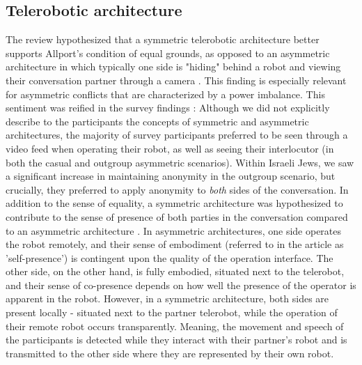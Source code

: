 \documentclass[dissertation,math,vertlayout,pdfa,colorlinks]{aaltoseries}
\begin{document}
\subsection{Telerobotic architecture}
The review hypothesized that a symmetric telerobotic architecture better supports Allport's condition of equal grounds, as opposed to an asymmetric architecture in which typically one side is "hiding" behind a robot and viewing their conversation partner through a camera \cite[p. 78]{peledTelerobotContactHypothesis2022}. This finding is especially relevant for asymmetric conflicts that are characterized by a power imbalance. This sentiment was reified in the survey findings \cite[p. 11]{peledTeleroboticIntergroupContact2024}: Although we did not explicitly describe to the participants the concepts of symmetric and asymmetric architectures, the majority of survey participants preferred to be seen through a video feed when operating their robot, as well as seeing their interlocutor (in both the casual and outgroup asymmetric scenarios). Within Israeli Jews, we saw a significant increase in maintaining anonymity in the outgroup scenario, but crucially, they preferred to apply anonymity to \textit{both} sides of the conversation. In addition to the sense of equality, a symmetric architecture was hypothesized to contribute to the sense of presence of both parties in the conversation compared to an asymmetric architecture \cite[p. 78]{peledTeleroboticIntergroupContact2024}. In asymmetric architectures, one side operates the robot remotely, and their sense of embodiment (referred to in the article as 'self-presence') is contingent upon the quality of the operation interface. The other side, on the other hand, is fully embodied, situated next to the telerobot, and their sense of co-presence depends on how well the presence of the operator is apparent in the robot. However, in a symmetric architecture, both sides are present locally - situated next to the partner telerobot, while the operation of their remote robot occurs transparently. Meaning, the movement and speech of the participants is detected while they interact with their partner's robot and is transmitted to the other side where they are represented by their own robot.
\end{document}
